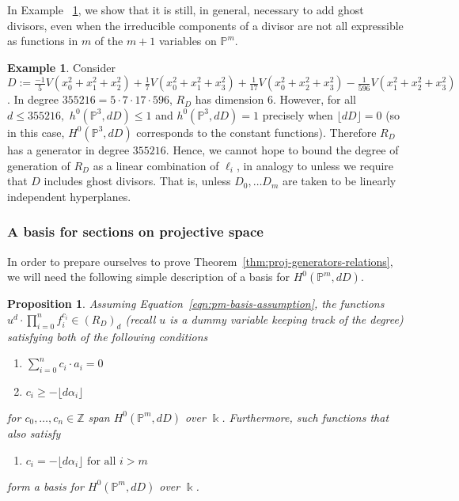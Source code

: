 \documentclass{amsart}
\theoremstyle{plain}
\newtheorem{prop}[thm]{Proposition}
\theoremstyle{definition}
\newtheorem{example}[thm]{Example}
\theoremstyle{remark}
\numberwithin{equation}{section}
\newcommand\sssec{\subsubsection}
\newcommand\bp{{\mathbb P}}
\newcommand\bz{{\mathbb Z}}
\newcommand\bk{{\Bbbk}}
\newcommand\bida{a}
\begin{document}
In Example ~\ref{eg:radical}, we show that it is still, in general,
necessary to add ghost divisors, even when the irreducible components
of a divisor are not all
expressible as functions in $m$ of the $m+1$ variables on $\bp^m$.

\begin{example}
\label{eg:radical}
Consider $D :=\frac{-1}{5}V(x_0^2 + x_1^2 + x_2^2) + \frac{1}{7}V(x_0^2 + x_1^2 +
x_3^2) + \frac{1}{17}V(x_0^2 + x_2^2 + x_3^2) - \frac{1}{596}V(x_1^2 + x_2^2 +
x_3^2)$. In degree $355216 = 5 \cdot 7 \cdot 17 \cdot 596$, $R_D$ has dimension
$6$.
However, for all $d \leq 355216,$ $h^0(\bp^3, dD) \leq 1$
and 
$h^0(\bp^3, dD)  = 1$ precisely when $\lfloor d D \rfloor = 0$ 
(so in this case, $H^0(\bp^3, d D)$ corresponds to the constant functions).
Therefore $R_D$ has a generator in degree $355216$.
Hence, we cannot hope to bound the degree
of generation of $R_D$ as a linear combination of $\ell_i$,
in analogy to \cite[Theorem 8]{dorney:canonical}
unless we require that $D$ includes ghost divisors. That is, unless
$D_0,\ldots D_m$ are taken to be linearly independent hyperplanes.
\end{example}

\sssec*{A basis for sections on projective space}
\label{sssec:basis-projective}

In order to prepare ourselves to prove Theorem~\ref{thm:proj-generators-relations},
we will need the following simple description of
a basis for $H^0(\bp^m, dD)$.

\begin{prop}
\label{prop:pm-span-and-basis}
Assuming Equation~\ref{eqn:pm-basis-assumption},
the functions $u^d \cdot \prod_{i=0}^n f_i^{c_i} \in (R_D)_d$ \rm{(}recall $u$ is a dummy variable keeping
track of the degree\rm{)}
satisfying
both of the following conditions

\begin{enumerate}
	\item $\sum_{i=0}^{n} c_i \cdot \bida_i = 0$
	\item $c_i \geq - \lfloor d \alpha_i \rfloor$
\end{enumerate}

\noindent
for $c_0, \ldots, c_n \in \bz$
span $H^0(\bp^m, dD)$ over $\bk$. Furthermore, such functions 
that also satisfy
\begin{enumerate}[resume]
	\item $c_i = -\lfloor d\alpha_i \rfloor \text{ for all } i > m$
\end{enumerate}

\noindent
form a basis for $H^0(\bp^m, dD)$ over $\bk$.
\end{prop}
\end{document}
